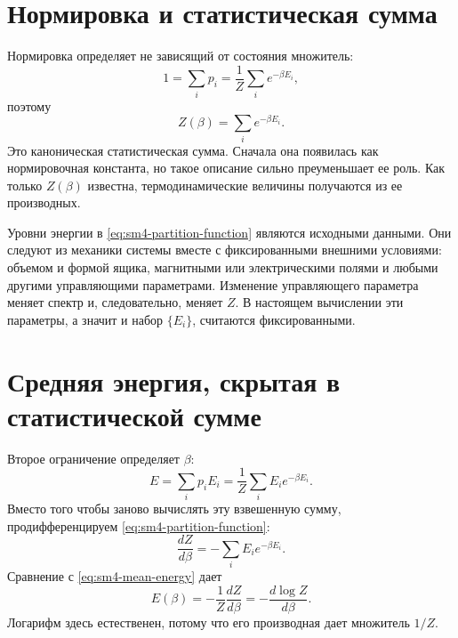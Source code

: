 \section{Нормировка и статистическая сумма}

Нормировка определяет не зависящий от состояния множитель:
\begin{equation}
 1=\sum_i p_i
 =\frac{1}{Z}\sum_i e^{-\beta E_i},
\end{equation}
поэтому
\begin{equation}
 Z(\beta)=\sum_i e^{-\beta E_i}.
 \label{eq:sm4-partition-function}
\end{equation}
Это каноническая статистическая сумма. Сначала она появилась как нормировочная константа, но такое описание сильно преуменьшает ее роль. Как только \(Z(\beta)\) известна, термодинамические величины получаются из ее производных.

Уровни энергии в \eqref{eq:sm4-partition-function} являются исходными данными. Они следуют из механики системы вместе с фиксированными внешними условиями: объемом и формой ящика, магнитными или электрическими полями и любыми другими управляющими параметрами. Изменение управляющего параметра меняет спектр и, следовательно, меняет \(Z\). В настоящем вычислении эти параметры, а значит и набор \(\{E_i\}\), считаются фиксированными.

\begin{classroomqa}
\end{classroomqa}

\section{Средняя энергия, скрытая в статистической сумме}

Второе ограничение определяет \(\beta\):
\begin{equation}
 E=\sum_i p_iE_i
 =\frac{1}{Z}\sum_i E_i e^{-\beta E_i}.
 \label{eq:sm4-mean-energy}
\end{equation}
Вместо того чтобы заново вычислять эту взвешенную сумму, продифференцируем
\eqref{eq:sm4-partition-function}:
\begin{equation}
 \frac{dZ}{d\beta}
 =-\sum_i E_i e^{-\beta E_i}.
\end{equation}
Сравнение с \eqref{eq:sm4-mean-energy} дает
\begin{equation}
 E(\beta)
 =-\frac{1}{Z}\frac{dZ}{d\beta}
 =-\frac{d\log Z}{d\beta}.
 \label{eq:sm4-energy-logz}
\end{equation}
Логарифм здесь естественен, потому что его производная дает множитель
\(1/Z\).

